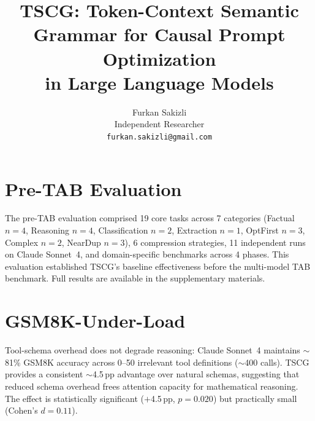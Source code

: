\documentclass[11pt,a4paper]{article}
\title{TSCG: Token-Context Semantic Grammar for Causal Prompt Optimization\\in Large Language Models}
\author{Furkan Sakizli \\
  Independent Researcher \\
  \texttt{furkan.sakizli@gmail.com}}
\begin{document}
\maketitle
















\appendix

\section{Pre-TAB Evaluation}
\label{app:pre-tab}

The pre-TAB evaluation comprised 19 core tasks across 7 categories (Factual $n{=}4$, Reasoning $n{=}4$, Classification $n{=}2$, Extraction $n{=}1$, OptFirst $n{=}3$, Complex $n{=}2$, NearDup $n{=}3$), 6 compression strategies, 11 independent runs on Claude Sonnet~4, and domain-specific benchmarks across 4 phases. This evaluation established TSCG's baseline effectiveness before the multi-model TAB benchmark. Full results are available in the supplementary materials.

\section{GSM8K-Under-Load}
\label{app:gsm8k}

Tool-schema overhead does not degrade reasoning: Claude Sonnet~4 maintains ${\sim}$81\% GSM8K accuracy across 0--50 irrelevant tool definitions (${\sim}$400 calls). TSCG provides a consistent ${\sim}$4.5\,pp advantage over natural schemas, suggesting that reduced schema overhead frees attention capacity for mathematical reasoning. The effect is statistically significant ($+$4.5\,pp, $p = 0.020$) but practically small (Cohen's $d = 0.11$).
\end{document}
